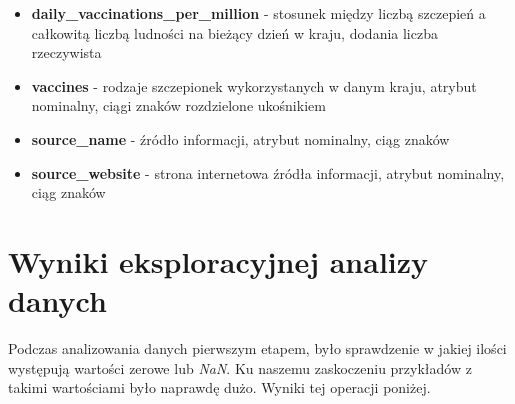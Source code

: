 \documentclass[12pt, oneside, openany]{article}
\begin{document}
\begin{itemize}
\item \textbf{daily\_vaccinations\_per\_million} - stosunek między liczbą szczepień a całkowitą liczbą ludności na bieżący dzień w kraju, dodania liczba rzeczywista
\item \textbf{vaccines} - rodzaje szczepionek wykorzystanych w danym kraju, atrybut nominalny, ciągi znaków rozdzielone ukośnikiem
\item \textbf{source\_name} - źródło informacji, atrybut nominalny, ciąg znaków
\item \textbf{source\_website} - strona internetowa źródła informacji, atrybut nominalny, ciąg znaków
\end{itemize}


\section{Wyniki eksploracyjnej analizy danych}



Podczas analizowania danych pierwszym etapem, było sprawdzenie w jakiej ilości występują wartości zerowe lub \textit{NaN}. Ku naszemu zaskoczeniu przykładów z takimi wartościami było naprawdę dużo. Wyniki tej operacji poniżej. 
\end{document}
